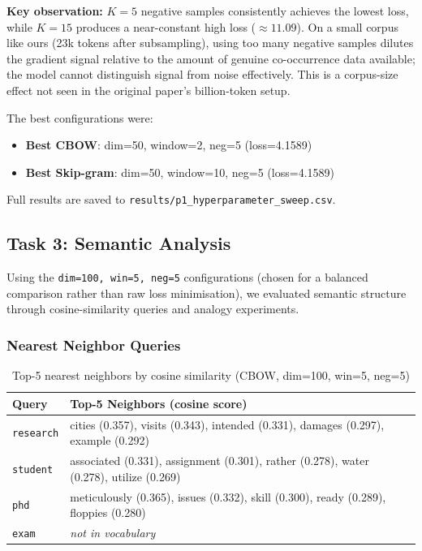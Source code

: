 \documentclass[11pt, a4paper]{article}
\begin{document}
\textbf{Key observation:} $K=5$ negative samples consistently achieves the lowest loss, while $K=15$ produces a near-constant high loss ($\approx 11.09$). On a small corpus like ours (23k tokens after subsampling), using too many negative samples dilutes the gradient signal relative to the amount of genuine co-occurrence data available; the model cannot distinguish signal from noise effectively. This is a corpus-size effect not seen in the original paper's billion-token setup.

The best configurations were:
\begin{itemize}[noitemsep]
    \item \textbf{Best CBOW}: dim=50, window=2, neg=5 (loss=4.1589)
    \item \textbf{Best Skip-gram}: dim=50, window=10, neg=5 (loss=4.1589)
\end{itemize}

Full results are saved to \texttt{results/p1\_hyperparameter\_sweep.csv}.

\subsection{Task 3: Semantic Analysis}

Using the \texttt{dim=100, win=5, neg=5} configurations (chosen for a balanced comparison rather than raw loss minimisation), we evaluated semantic structure through cosine-similarity queries and analogy experiments.

\subsubsection{Nearest Neighbor Queries}

\begin{table}[H]
\centering
\caption{Top-5 nearest neighbors by cosine similarity (CBOW, dim=100, win=5, neg=5)}
\begin{tabular}{lp{}}
\toprule
\textbf{Query} & \textbf{Top-5 Neighbors (cosine score)} \\
\midrule
\texttt{research}  & cities (0.357), visits (0.343), intended (0.331), damages (0.297), example (0.292) \\
\texttt{student}   & associated (0.331), assignment (0.301), rather (0.278), water (0.278), utilize (0.269) \\
\texttt{phd}       & meticulously (0.365), issues (0.332), skill (0.300), ready (0.289), floppies (0.280) \\
\texttt{exam}      & \textit{not in vocabulary} \\
\bottomrule
\end{tabular}
\end{table}
\end{document}
